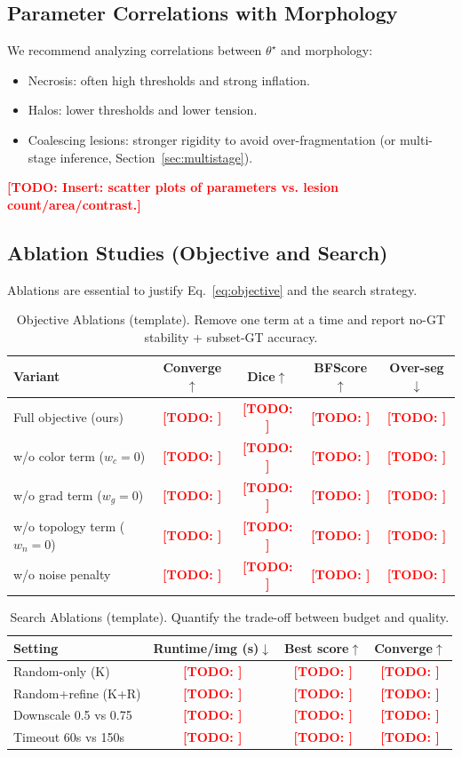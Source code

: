 \documentclass[journal]{IEEEtran}
\newcommand{\TODO}[1]{\textcolor{red}{\textbf{[TODO: #1]}}}
\begin{document}
\subsection{Parameter Correlations with Morphology}
We recommend analyzing correlations between $\theta^\star$ and morphology:
\begin{itemize}
    \item Necrosis: often high thresholds and strong inflation.
    \item Halos: lower thresholds and lower tension.
    \item Coalescing lesions: stronger rigidity to avoid over-fragmentation (or multi-stage inference, Section~\ref{sec:multistage}).
\end{itemize}
\TODO{Insert: scatter plots of parameters vs. lesion count/area/contrast.}

\subsection{Ablation Studies (Objective and Search)}
\label{sec:ablations}
Ablations are essential to justify Eq.~\eqref{eq:objective} and the search strategy.

\begin{table}[t]
\centering
\caption{Objective Ablations (template). Remove one term at a time and report no-GT stability + subset-GT accuracy.}
\label{tab:abl_obj}
\begin{tabular}{lcccc}
\toprule
Variant & Converge$\uparrow$ & Dice$\uparrow$ & BFScore$\uparrow$ & Over-seg$\downarrow$ \\
\midrule
Full objective (ours) & \TODO{ } & \TODO{ } & \TODO{ } & \TODO{ } \\
w/o color term ($w_c{=}0$) & \TODO{ } & \TODO{ } & \TODO{ } & \TODO{ } \\
w/o grad term ($w_g{=}0$) & \TODO{ } & \TODO{ } & \TODO{ } & \TODO{ } \\
w/o topology term ($w_n{=}0$) & \TODO{ } & \TODO{ } & \TODO{ } & \TODO{ } \\
w/o noise penalty & \TODO{ } & \TODO{ } & \TODO{ } & \TODO{ } \\
\bottomrule
\end{tabular}
\end{table}

\begin{table}[t]
\centering
\caption{Search Ablations (template). Quantify the trade-off between budget and quality.}
\label{tab:abl_search}
\begin{tabular}{lccc}
\toprule
Setting & Runtime/img (s)$\downarrow$ & Best score$\uparrow$ & Converge$\uparrow$ \\
\midrule
Random-only (K) & \TODO{ } & \TODO{ } & \TODO{ } \\
Random+refine (K+R) & \TODO{ } & \TODO{ } & \TODO{ } \\
Downscale 0.5 vs 0.75 & \TODO{ } & \TODO{ } & \TODO{ } \\
Timeout 60s vs 150s & \TODO{ } & \TODO{ } & \TODO{ } \\
\bottomrule
\end{tabular}
\end{table}
\end{document}
